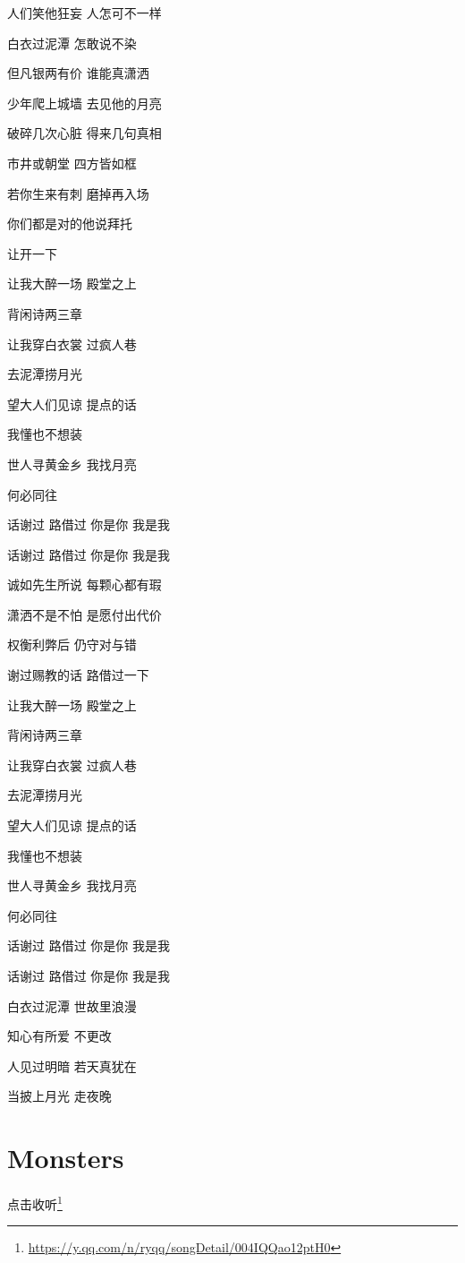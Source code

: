 \documentclass[]{ctexbook}
\renewcommand{\href}[2]{#2\footnote{\url{#1}}}
\begin{document}
人们笑他狂妄 人怎可不一样

白衣过泥潭 怎敢说不染

但凡银两有价 谁能真潇洒

少年爬上城墙 去见他的月亮

破碎几次心脏 得来几句真相

市井或朝堂 四方皆如框

若你生来有刺 磨掉再入场

你们都是对的他说拜托

让开一下

让我大醉一场 殿堂之上

背闲诗两三章

让我穿白衣裳 过疯人巷

去泥潭捞月光

望大人们见谅 提点的话

我懂也不想装

世人寻黄金乡 我找月亮

何必同往

话谢过 路借过 你是你 我是我

话谢过 路借过 你是你 我是我

诚如先生所说 每颗心都有瑕

潇洒不是不怕 是愿付出代价

权衡利弊后 仍守对与错

谢过赐教的话 路借过一下

让我大醉一场 殿堂之上

背闲诗两三章

让我穿白衣裳 过疯人巷

去泥潭捞月光

望大人们见谅 提点的话

我懂也不想装

世人寻黄金乡 我找月亮

何必同往

话谢过 路借过 你是你 我是我

话谢过 路借过 你是你 我是我

白衣过泥潭 世故里浪漫

知心有所爱 不更改

人见过明暗 若天真犹在

当披上月光 走夜晚

\section*{Monsters}\label{Monsters}


\href{https://y.qq.com/n/ryqq/songDetail/004IQQao12ptH0}{点击收听}
\end{document}
